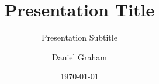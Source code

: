 \documentclass[10pt]{beamer}
\title{Presentation Title}
\subtitle{Presentation Subtitle}
\institute{The University of Cambridge}
\author{Daniel Graham}
\date{\today}
\begin{document}
\begin{frame}
\titlepage
\end{frame}


\begin{frame}{}

\end{frame}
\end{document}
